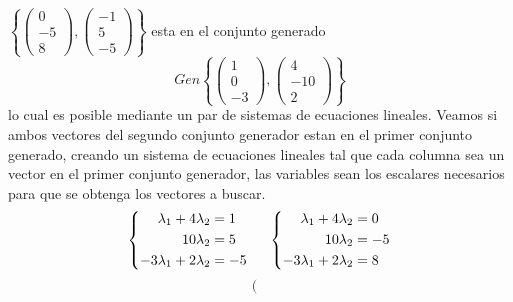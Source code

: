 \documentclass{article}
\begin{document}
\begin{enumerate}
        \(
            \left\{
                \begin{pmatrix}
                    0 \\ -5 \\ 8
                \end{pmatrix},
                \begin{pmatrix}
                    -1 \\ 5 \\ -5
                \end{pmatrix}
            \right\}
        \)
        esta en el conjunto generado 
        \[
            Gen
            \left\{
                \begin{pmatrix}
                    1 \\ 0 \\ -3
                \end{pmatrix},
                \begin{pmatrix}
                    4 \\ -10 \\ 2
                \end{pmatrix}
            \right\}
        \]
        lo cual es posible mediante un par de sistemas de ecuaciones lineales. Veamos si ambos vectores del segundo conjunto generador
        estan en el primer conjunto generado, creando un sistema de ecuaciones lineales tal que cada 
        columna sea un vector en el primer conjunto generador, las variables sean los escalares necesarios para 
        que se obtenga los vectores a buscar.
        \[
            \left\{
            \begin{aligned}
                \lambda_1 + 4\lambda_2 &= 1 \\
                10\lambda_2 &= 5 \\
                -3\lambda_1 + 2\lambda_2 &= -5 \\
            \end{aligned}
            \right.
            \hspace{0.5cm}
            \left\{
            \begin{aligned}
                \lambda_1 + 4\lambda_2 &= 0 \\
                10\lambda_2 &= -5 \\
                -3\lambda_1 + 2\lambda_2 &= 8 \\
            \end{aligned}
            \right.
        \]
        \[
            \left(\begin{array}{cc|cc}

\end{array}\]
\end{enumerate}
\end{document}
